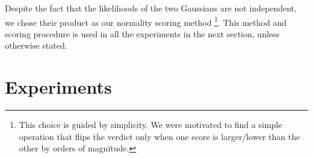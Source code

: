 \documentclass[10pt,twocolumn,letterpaper]{article}
\begin{document}
Despite the fact that the likelihoods of the two Gaussians are not independent, we chose their product as our normality scoring method \footnote{This choice is guided by simplicity. We were motivated to find a simple operation that flips the verdict only when one score is larger/lower than the other by orders of magnitude.}. This method and scoring procedure is used in all the experiments in the next section, unless otherwise stated.




























































































 
\section{Experiments}
\end{document}

